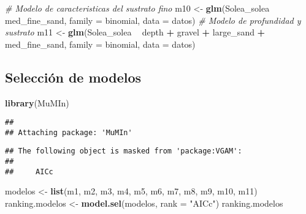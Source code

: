 \documentclass[
]{book}
\newenvironment{Shaded}{\begin{snugshade}}{\end{snugshade}}
\newcommand{\CommentTok}[1]{\textcolor[rgb]{0.56,0.35,0.01}{\textit{#1}}}
\newcommand{\DataTypeTok}[1]{\textcolor[rgb]{0.13,0.29,0.53}{#1}}
\newcommand{\KeywordTok}[1]{\textcolor[rgb]{0.13,0.29,0.53}{\textbf{#1}}}
\newcommand{\NormalTok}[1]{#1}
\newcommand{\OperatorTok}[1]{\textcolor[rgb]{0.81,0.36,0.00}{\textbf{#1}}}
\newcommand{\StringTok}[1]{\textcolor[rgb]{0.31,0.60,0.02}{#1}}
\begin{document}
\begin{Shaded}
\begin{Highlighting}[]
\CommentTok{# Modelo de caracteristicas del sustrato fino}
\NormalTok{m10 <-}\StringTok{ }\KeywordTok{glm}\NormalTok{(Solea_solea }\OperatorTok{~}\StringTok{ }\NormalTok{med_fine_sand, }\DataTypeTok{family =}\NormalTok{ binomial, }\DataTypeTok{data =}\NormalTok{ datos)}
\CommentTok{# Modelo de profundidad y sustrato}
\NormalTok{m11 <-}\StringTok{ }\KeywordTok{glm}\NormalTok{(Solea_solea }\OperatorTok{~}\StringTok{ }\NormalTok{depth }\OperatorTok{+}\StringTok{ }\NormalTok{gravel }\OperatorTok{+}\StringTok{ }\NormalTok{large_sand }\OperatorTok{+}\StringTok{ }\NormalTok{med_fine_sand, }\DataTypeTok{family =}\NormalTok{ binomial, }\DataTypeTok{data =}\NormalTok{ datos)}
\end{Highlighting}
\end{Shaded}

\hypertarget{selecciuxf3n-de-modelos}{%
\subsection{Selección de modelos}\label{selecciuxf3n-de-modelos}}

\begin{Shaded}
\begin{Highlighting}[]
\KeywordTok{library}\NormalTok{(MuMIn)}
\end{Highlighting}
\end{Shaded}

\begin{verbatim}
## 
## Attaching package: 'MuMIn'
\end{verbatim}

\begin{verbatim}
## The following object is masked from 'package:VGAM':
## 
##     AICc
\end{verbatim}

\begin{Shaded}
\begin{Highlighting}[]
\NormalTok{modelos <-}\StringTok{ }\KeywordTok{list}\NormalTok{(m1, m2, m3, m4, m5, m6, m7, m8, m9, m10, m11)}
\NormalTok{ranking.modelos <-}\StringTok{ }\KeywordTok{model.sel}\NormalTok{(modelos, }\DataTypeTok{rank =} \StringTok{"AICc"}\NormalTok{)}
\NormalTok{ranking.modelos}
\end{Highlighting}
\end{Shaded}
\end{document}
